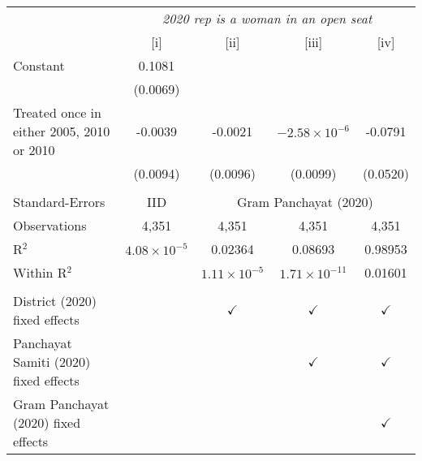 
\begingroup
\centering
\begin{tabular}{lcccc}
   \toprule
    & \multicolumn{4}{c}{\textit{2020 rep is a woman in an open seat}}\\
                                             & [i]                   & [ii]                  & [iii]                  & [iv]\\  
   \midrule 
   Constant                                  & 0.1081                &                       &                        &   \\   
                                             & (0.0069)              &                       &                        &   \\   
   Treated once in either 2005, 2010 or 2010 & -0.0039               & -0.0021               & $-2.58\times 10^{-6}$  & -0.0791\\   
                                             & (0.0094)              & (0.0096)              & (0.0099)               & (0.0520)\\   
    \\
   Standard-Errors & IID & \multicolumn{3}{c}{Gram Panchayat (2020)} \\ 
   Observations                              & 4,351                 & 4,351                 & 4,351                  & 4,351\\  
   R$^2$                                     & $4.08\times 10^{-5}$  & 0.02364               & 0.08693                & 0.98953\\  
   Within R$^2$                              &                       & $1.11\times 10^{-5}$  & $1.71\times 10^{-11}$  & 0.01601\\  
    \\
   District (2020) fixed effects             &                       & $\checkmark$          & $\checkmark$           & $\checkmark$\\   
   Panchayat Samiti (2020) fixed effects     &                       &                       & $\checkmark$           & $\checkmark$\\   
   Gram Panchayat (2020) fixed effects       &                       &                       &                        & $\checkmark$\\   
   \bottomrule
\end{tabular}
\par\endgroup


